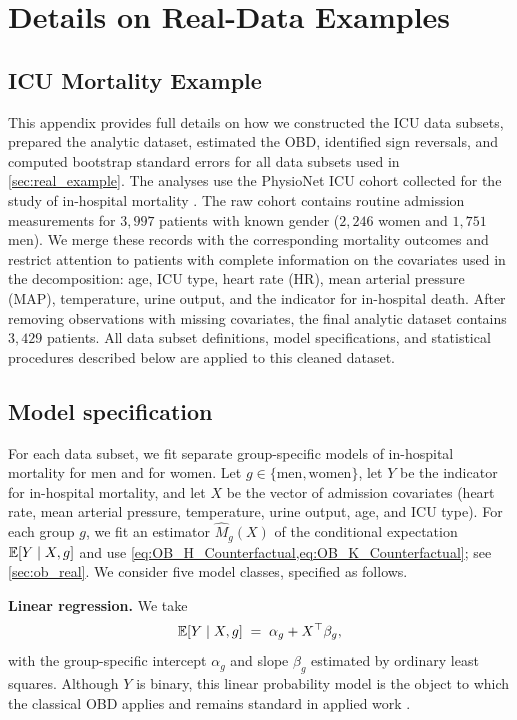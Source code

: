 \section{Details on Real-Data Examples}
\subsection{ICU Mortality Example}
\label{appendix:icu_details}

This appendix provides full details on how we constructed the ICU data subsets, prepared the analytic dataset, estimated the OBD, identified sign reversals, and computed bootstrap standard errors for all data subsets used in \cref{sec:real_example}. The analyses use the PhysioNet ICU cohort collected for the study of in-hospital mortality \citep{goldberger2000physiobank}. The raw cohort contains routine admission measurements for $3,997$ patients with known gender ($2,246$ women and $1,751$ men). We merge these records with the corresponding mortality outcomes and restrict attention to patients with complete information on the covariates used in the decomposition: age, ICU type, heart rate (HR), mean arterial pressure (MAP), temperature, urine output, and the indicator for in-hospital death. After removing observations with missing covariates, the final analytic dataset contains $3,429$ patients. All data subset definitions, model specifications, and statistical procedures described below are applied to this cleaned dataset.

\subsection*{Model specification}

For each data subset, we fit separate group-specific models of in-hospital mortality for men and for women. Let $g \in \{\text{men}, \text{women}\}$, let $Y$ be the indicator for in-hospital mortality, and let $X$ be the vector of admission covariates (heart rate, mean arterial pressure, temperature, urine output, age, and ICU type). For each group $g$, we fit an estimator $\hat{M}_g(X)$ of the conditional expectation $\mathbb{E}[Y \mid X, g]$ and use \cref{eq:OB_H_Counterfactual,eq:OB_K_Counterfactual}; see \cref{sec:ob_real}. We consider five model classes, specified as follows.

\textbf{Linear regression.} We take
\[
    \mathbb{E}[Y \mid X, g] \;=\; \alpha_{g} + X^{\top}\beta_{g},
\]
with the group-specific intercept $\alpha_{g}$ and slope $\beta_{g}$ estimated by ordinary least squares. Although $Y$ is binary, this linear probability model is the object to which the classical OBD applies and remains standard in applied work \citep{jann2008, edokaChangesCatastrophicHealth2017, sujin_LPM_OB, mweembaGapSelfRatedHealth2023}.

